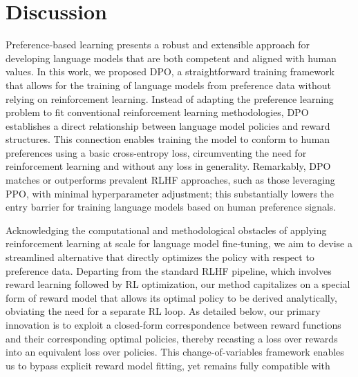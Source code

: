 \section{Discussion}
Preference-based learning presents a robust and extensible approach for developing language models that are both competent and aligned with human values. In this work, we proposed DPO, a straightforward training framework that allows for the training of language models from preference data without relying on reinforcement learning. Instead of adapting the preference learning problem to fit conventional reinforcement learning methodologies, DPO establishes a direct relationship between language model policies and reward structures. This connection enables training the model to conform to human preferences using a basic cross-entropy loss, circumventing the need for reinforcement learning and without any loss in generality. Remarkably, DPO matches or outperforms prevalent RLHF approaches, such as those leveraging PPO, with minimal hyperparameter adjustment; this substantially lowers the entry barrier for training language models based on human preference signals.

Acknowledging the computational and methodological obstacles of applying reinforcement learning at scale for language model fine-tuning, we aim to devise a streamlined alternative that directly optimizes the policy with respect to preference data. Departing from the standard RLHF pipeline, which involves reward learning followed by RL optimization, our method capitalizes on a special form of reward model that allows its optimal policy to be derived analytically, obviating the need for a separate RL loop. As detailed below, our primary innovation is to exploit a closed-form correspondence between reward functions and their corresponding optimal policies, thereby recasting a loss over rewards into an equivalent loss over policies. This change-of-variables framework enables us to bypass explicit reward model fitting, yet remains fully compatible with

